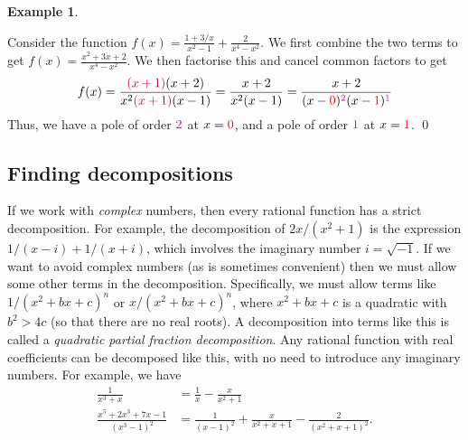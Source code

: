 \documentclass[a4paper]{book}
\newcommand{\RED}[1]{{\color{red}#1}}
\newcommand{\PURPLE}[1]{{\color{purple}#1}}
\newcommand{\MAGENTA}[1]{{\color{magenta}#1}}
\renewcommand{\:}{\colon}
\newcommand{\bilabel}[1]{\hypertarget{#1}{\label{#1}}}
\newcommand{\EMPH}[1]{\RED{\emph{#1}}}
\newcommand{\DEFN}[1]{\PURPLE{\emph{#1}}}
\theoremstyle{definition}
\newtheorem{example}[theorem]{Example}
\begin{document}
\begin{example}\bilabel{eg-poles-iv}
 Consider the function $f(x)=\frac{1+3/x}{x^2-1}+\frac{2}{x^4-x^2}$.
 We first combine the two terms to get
 $f(x)=\frac{x^2+3x+2}{x^4-x^2}$.  We then factorise this and cancel
 common factors to get
 \[ f(x) = \frac{\PURPLE{(x+1)}(x+2)}{x^2\PURPLE{(x+1)}(x-1)}
         = \frac{x+2}{x^2(x-1)} = 
           \frac{x+2}{(x-\RED{0})^\MAGENTA{2}(x-\RED{1})^\MAGENTA{1}}
 \]
 Thus, we have a pole of order $\MAGENTA{2}$ at $x=\RED{0}$, and a
 pole of order $\MAGENTA{1}$ at $x=\RED{1}$. \qed
\end{example}

\subsection*{Finding decompositions}

If we work with \EMPH{complex} numbers, then every rational function
has a strict decomposition.  For example, the decomposition of
$2x/(x^2+1)$ is the expression $1/(x-i)+1/(x+i)$, which involves the
imaginary number $i=\sqrt{-1}$.  If we want to avoid complex numbers
(as is sometimes convenient) then we must allow some other terms in
the decomposition.  Specifically, we must allow terms like
$1/(x^2+bx+c)^n$ or $x/(x^2+bx+c)^n$, where $x^2+bx+c$ is a quadratic
with $b^2>4c$ (so that there are no real roots).  A decomposition into
terms like this is called a \DEFN{quadratic partial fraction
  decomposition}.  Any rational function with real coefficients can be
decomposed like this, with no need to introduce any imaginary numbers.
For example, we have
\begin{align*}
  \frac{1}{x^3+x} &=
   \frac{1}{x} - \frac{x}{x^2+1} \\
  \frac{x^5+2x^3+7x-1}{(x^3-1)^2} &=
   \frac{1}{(x-1)^2} + \frac{x}{x^2+x+1} - \frac{2}{(x^2+x+1)^2}.
\end{align*}
\end{document}
